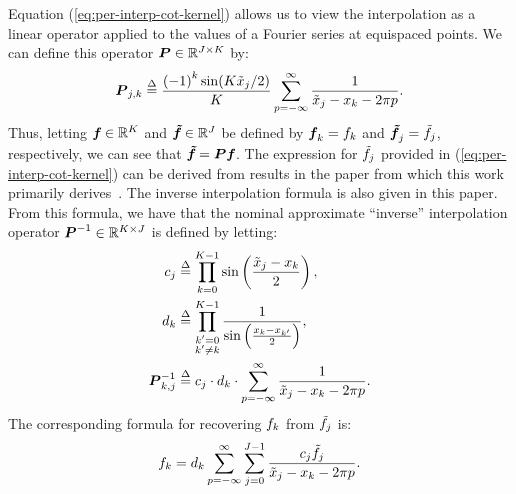 Equation (\ref{eq:per-interp-cot-kernel}) allows us to view the
interpolation as a linear operator applied to the values of a Fourier
series at equispaced points. We can define this operator
$\boldsymbol{P}\in\mathbb{R}^{J\times K}$ by:
\begin{align}
  \label{eq:interp-operator}
  \boldsymbol{P}_{j,k} \overset{\Delta}{=} \frac{{(-1)}^k \sin(K{\tilde{x}}_{j}/2)}{K} \sum_{p=-\infty}^\infty \frac{1}{{\tilde{x}}_{j} - {x}_{k} - 2\pi p}.
\end{align}
Thus, letting $\boldsymbol{{f}_{}}\in\mathbb{R}^K$ and
$\boldsymbol{{\tilde{f}}_{}}\in\mathbb{R}^J$ be defined by
$\boldsymbol{{f}_{}}_k = {f}_{k}$ and
$\boldsymbol{{\tilde{f}}_{}}_j = {\tilde{f}}_{j}$, respectively, we can
see that $\boldsymbol{{\tilde{f}}_{}} = \boldsymbol{P}\boldsymbol{{f}_{}}$. The expression for
${\tilde{f}}_{j{}}$ provided in (\ref{eq:per-interp-cot-kernel})
can be derived from results in the paper from which this work
primarily derives~\cite{Dutt95fastfourierII}. The inverse
interpolation formula is also given in this paper. From this formula,
we have that the nominal approximate ``inverse'' interpolation
operator $\boldsymbol{P}^{-1}\in\mathbb{R}^{K\times J}$ is defined
by letting:
\begin{align}
  c_{j} &\overset{\Delta}{=} \prod_{k=0}^{K-1} \sin\left(\frac{{\tilde{x}}_{j}-{x}_{k}}{2}\right), \label{eq:cjs} \\
  d_{k} &\overset{\Delta}{=} \prod_{\substack{k'=0 \\ k'\neq k}}^{K-1} \frac{1}{\sin\left(\frac{{x}_{k} - {x}_{k{}'}}{2}\right)}, \label{eq:dks} \\
  \boldsymbol{P}^{-1}_{k,j} &\overset{\Delta}{=} c_{j}\cdot d_{k}\cdot\sum_{p=-\infty}^\infty \frac{1}{{\tilde{x}}_{j} - {x}_{k} - 2\pi p}. \label{eq:inverse-interp-operator}
\end{align}
The corresponding formula for recovering ${f}_{k}$ from
${\tilde{f}}_{j}$ is:
\begin{align}\label{eq:per-inv-interp-cot-kernel}
  {f}_{k} = d_{k} \sum_{p=-\infty}^\infty\sum_{j=0}^{J-1}\frac{c_{j} {\tilde{f}}_{j}}{{\tilde{x}}_{j} - {x}_{k} - 2\pi p}.
\end{align}

